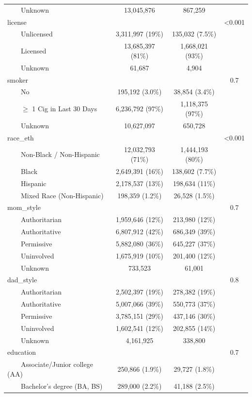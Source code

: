 \documentclass[
]{article}
\begin{document}
\begin{table}[t]
\begin{tabular*}{\linewidth}{@{\extracolsep{\fill}}lccc}
    Unknown & 13,045,876 & 867,259 &  \\ 
license &  &  & <0.001 \\ 
    Unlicensed & 3,311,997 (19\%) & 135,032 (7.5\%) &  \\ 
    Licensed & 13,685,397 (81\%) & 1,668,021 (93\%) &  \\ 
    Unknown & 61,687 & 4,904 &  \\ 
smoker &  &  & 0.7 \\ 
    No & 195,192 (3.0\%) & 38,854 (3.4\%) &  \\ 
    \ensuremath{\geq} 1 Cig in Last 30 Days & 6,236,792 (97\%) & 1,118,375 (97\%) &  \\ 
    Unknown & 10,627,097 & 650,728 &  \\ 
race\_eth &  &  & <0.001 \\ 
    Non-Black / Non-Hispanic & 12,032,793 (71\%) & 1,444,193 (80\%) &  \\ 
    Black & 2,649,391 (16\%) & 138,602 (7.7\%) &  \\ 
    Hispanic & 2,178,537 (13\%) & 198,634 (11\%) &  \\ 
    Mixed Race (Non-Hispanic) & 198,359 (1.2\%) & 26,528 (1.5\%) &  \\ 
mom\_style &  &  & 0.7 \\ 
    Authoritarian & 1,959,646 (12\%) & 213,980 (12\%) &  \\ 
    Authoritative & 6,807,912 (42\%) & 686,349 (39\%) &  \\ 
    Permissive & 5,882,080 (36\%) & 645,227 (37\%) &  \\ 
    Uninvolved & 1,675,919 (10\%) & 201,400 (12\%) &  \\ 
    Unknown & 733,523 & 61,001 &  \\ 
dad\_style &  &  & 0.8 \\ 
    Authoritarian & 2,502,397 (19\%) & 278,382 (19\%) &  \\ 
    Authoritative & 5,007,066 (39\%) & 550,773 (37\%) &  \\ 
    Permissive & 3,785,151 (29\%) & 437,146 (30\%) &  \\ 
    Uninvolved & 1,602,541 (12\%) & 202,855 (14\%) &  \\ 
    Unknown & 4,161,925 & 338,800 &  \\ 
education &  &  & 0.7 \\ 
    Associate/Junior college (AA) & 250,866 (1.9\%) & 29,727 (1.8\%) &  \\ 
    Bachelor's degree (BA, BS) & 289,000 (2.2\%) & 41,188 (2.5\%) &  \\ 

\end{tabular*}
\end{table}
\end{document}
